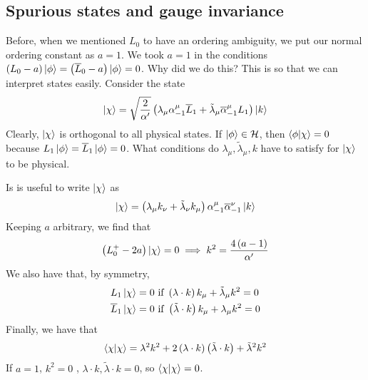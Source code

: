 \documentclass[11pt, oneside]{article}   	%
\theoremstyle{slanted}
\begin{document}
\subsection{Spurious states and gauge invariance}
Before, when we mentioned $ L _ 0 $ to 
have an ordering ambiguity, 
we put our normal ordering constant  as $ a =1 $. 
We took $ a = 1  $ in the 
conditions $ \left( L_0  - a\right) \ket{ \phi }  = 
\left( \overline{ L } _ 0 - a  \right)  \ket{ \phi }  = 0  $. 
Why did we do this? 
This is so that we can interpret states easily. 
Consider the state 
\[
 \ket{ \chi }  = \sqrt{ \frac{2}{\alpha  ' } }  
 \left( \lambda _ \mu \alpha _{ - 1 } ^ \mu \overline{ L } _{  1 } + \tilde{\lambda }_ \mu 
 \overline{ \alpha } _{ - 1 } ^ \mu L _ 1  \right)  \ket{ k } 
\] Clearly, $ \ket{ \chi } $ is orthogonal 
to all physical states. 
If $ \ket{ \phi } \in \mathcal{ H } $, then $ \bra{ \phi }\ket{ \chi }  = 0  $
because $ L_1 \ket{ \phi }  = \overline{ L } _ 1 \ket{ \phi }   =0 $. 
What conditions do $ \lambda _ \mu , \tilde{\lambda }_ \mu  ,k   $ 
have to satisfy for $ \ket{ \chi }  $ to be physical. 

Is is useful to write $ \ket{ \chi } $ as 
\[
	\ket{ \chi }  = \left(  \lambda _ \mu 
	k _ \nu + \tilde{ \lambda } _ \nu k _ \mu  \right)  \alpha _{ - 1 } ^ \mu 	\overline{ \alpha }_{ - 1 } ^ \nu \ket{ k } 
\] Keeping $ a  $ arbitrary, 
we find that 
\[
	\left( L_0^ +  - 2 a  \right) \ket{ \chi }  = 0 \implies  k ^ 2  = \frac{ 4 \left( 
	a  - 1  \right)  }{ \alpha ' } 
\] We also have that, by symmetry, 
\begin{align*}
	L_ 1 \ket{ \chi } =0 & \text{ if } \left( \lambda \cdot  k  \right)  
	k _ \mu + \tilde{ \lambda } _ \mu k ^ 2  = 0 \\
	\overline{ L } _ 1 \ket{ \chi }  = 0 & \text{ if } \left( 
	\tilde{ \lambda } \cdot  k  \right)  k _ \mu + \lambda _ \mu k ^ 2  = 0 
\end{align*}
Finally, we have that 
\[
	\bra{ \chi }\ket{ \chi }  = \lambda ^ 2 k ^ 2 + 2 \left( 
	\lambda \cdot  k \right)  \left( \tilde{ \lambda } \cdot  k   \right)  + \tilde{ \lambda } ^ 2 k ^ 2  
\] If $ a = 1 $, $ k ^ 2  = 0  $ , $ \lambda \cdot  k , \tilde{ \lambda } \cdot  k  =0  $, 
so $\bra{ \chi }\ket{ \chi } =0 $. 
\end{document}
